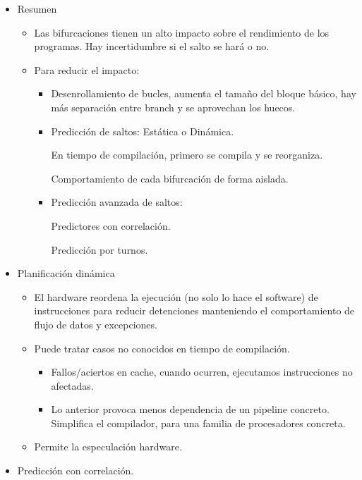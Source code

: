 \documentclass[12pt, twoside, openright]{report} %
\begin{document}
\begin{itemize}
  \item Resumen

    \begin{itemize}
    
    \item
      Las bifurcaciones tienen un alto impacto sobre el rendimiento de
      los programas. Hay incertidumbre si el salto se hará o no.
    \item
      Para reducir el impacto:

      \begin{itemize}
      
      \item
        Desenrollamiento de bucles, aumenta el tamaño del bloque básico,
        hay más separación entre branch y se aprovechan los huecos.
      \item
        Predicción de saltos: Estática o Dinámica.

        
          En tiempo de compilación, primero se compila y se reorganiza.

          Comportamiento de cada bifurcación de forma aislada.
      \item
        Predicción avanzada de saltos:

        
          Predictores con correlación.
          
          Predicción por turnos.
        \end{itemize}
      \end{itemize}
  \item Planificación dinámica

    \begin{itemize}
    
    \item
      El hardware reordena la ejecución (no solo lo hace el software) de
      instrucciones para reducir detenciones manteniendo el
      comportamiento de flujo de datos y excepciones.
    \item
      Puede tratar casos no conocidos en tiempo de compilación.

      \begin{itemize}
      
      \item
        Fallos/aciertos en cache, cuando ocurren, ejecutamos
        instrucciones no afectadas.
      \item
        Lo anterior provoca menos dependencia de un pipeline concreto.
        Simplifica el compilador, para una familia de procesadores
        concreta.
      \end{itemize}
    \item
      Permite la especulación hardware.
    \end{itemize}
  \item Predicción con correlación.


\end{itemize}
\end{document}
